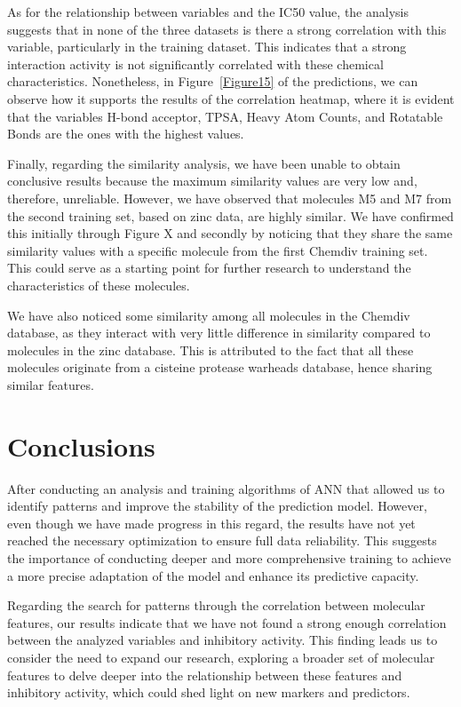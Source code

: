 \documentclass[final,times,twocolumn,article]{elsarticle}
\begin{document}
As for the relationship between variables and the IC50 value, the analysis suggests that in none of the three datasets is there a strong correlation with this variable, particularly in the training dataset. This indicates that a strong interaction activity is not significantly correlated with these chemical characteristics. Nonetheless, in Figure~\ref{Figure15} of the predictions, we can observe how it supports the results of the correlation heatmap, where it is evident that the variables H-bond acceptor, TPSA, Heavy Atom Counts, and Rotatable Bonds are the ones with the highest values.

Finally, regarding the similarity analysis, we have been unable to obtain conclusive results because the maximum similarity values are very low and, therefore, unreliable. However, we have observed that molecules M5 and M7 from the second training set, based on zinc data, are highly similar. We have confirmed this initially through Figure X and secondly by noticing that they share the same similarity values with a specific molecule from the first Chemdiv training set. This could serve as a starting point for further research to understand the characteristics of these molecules.

We have also noticed some similarity among all molecules in the Chemdiv database, as they interact with very little difference in similarity compared to molecules in the zinc database. This is attributed to the fact that all these molecules originate from a cisteine protease warheads database, hence sharing similar features.

\FloatBarrier
\section{Conclusions}

After conducting an analysis and training algorithms of ANN that allowed us to identify patterns and improve the stability of the prediction model. However, even though we have made progress in this regard, the results have not yet reached the necessary optimization to ensure full data reliability. This suggests the importance of conducting deeper and more comprehensive training to achieve a more precise adaptation of the model and enhance its predictive capacity.

Regarding the search for patterns through the correlation between molecular features, our results indicate that we have not found a strong enough correlation between the analyzed variables and inhibitory activity. This finding leads us to consider the need to expand our research, exploring a broader set of molecular features to delve deeper into the relationship between these features and inhibitory activity, which could shed light on new markers and predictors.
\end{document}
